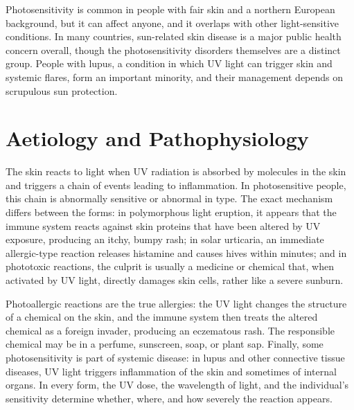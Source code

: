 Photosensitivity is common in people with fair skin and a northern European background, but it can affect anyone, and it overlaps with other light-sensitive conditions. In many countries, sun-related skin disease is a major public health concern overall, though the photosensitivity disorders themselves are a distinct group. People with lupus, a condition in which UV light can trigger skin and systemic flares, form an important minority, and their management depends on scrupulous sun protection.

\section*{Aetiology and Pathophysiology}
The skin reacts to light when UV radiation is absorbed by molecules in the skin and triggers a chain of events leading to inflammation. In photosensitive people, this chain is abnormally sensitive or abnormal in type. The exact mechanism differs between the forms: in polymorphous light eruption, it appears that the immune system reacts against skin proteins that have been altered by UV exposure, producing an itchy, bumpy rash; in solar urticaria, an immediate allergic-type reaction releases histamine and causes hives within minutes; and in phototoxic reactions, the culprit is usually a medicine or chemical that, when activated by UV light, directly damages skin cells, rather like a severe sunburn.

Photoallergic reactions are the true allergies: the UV light changes the structure of a chemical on the skin, and the immune system then treats the altered chemical as a foreign invader, producing an eczematous rash. The responsible chemical may be in a perfume, sunscreen, soap, or plant sap. Finally, some photosensitivity is part of systemic disease: in lupus and other connective tissue diseases, UV light triggers inflammation of the skin and sometimes of internal organs. In every form, the UV dose, the wavelength of light, and the individual's sensitivity determine whether, where, and how severely the reaction appears.

